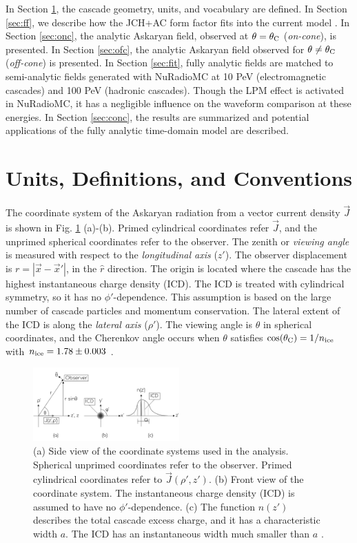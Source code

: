 \documentclass[amsmath,amssymb,aps,prd,10pt,twocolumn]{revtex4}
\begin{document}
In Section \ref{sec:unit}, the cascade geometry, units, and vocabulary are defined.  In Section \ref{sec:ff}, we describe how the JCH+AC form factor fits into the current model \cite{10.1016/j.astropartphys.2017.03.008}.  In Section \ref{sec:onc}, the analytic Askaryan field, observed at $\theta = \theta_{\rm C}$ (\textit{on-cone}), is presented.  In Section \ref{sec:ofc}, the analytic Askaryan field observed for $\theta \neq \theta_{\rm C}$ (\textit{off-cone}) is presented.  In Section \ref{sec:fit}, fully analytic fields are matched to semi-analytic fields generated with NuRadioMC \cite{10.1140/epjc/s10052-020-7612-8} at 10 PeV (electromagnetic cascades) and 100 PeV (hadronic cascades).  Though the LPM effect is activated in NuRadioMC, it has a negligible influence on the waveform comparison at these energies.  In Section \ref{sec:conc}, the results are summarized and potential applications of the fully analytic time-domain model are described.

\section{Units, Definitions, and Conventions}
\label{sec:unit}

The coordinate system of the Askaryan radiation from a vector current density $\vec{J}$ is shown in Fig. \ref{fig:geo} (a)-(b).  Primed cylindrical coordinates refer $\vec{J}$, and the unprimed spherical coordinates refer to the observer.  The zenith or \textit{viewing angle} is measured with respect to the \textit{longitudinal axis} ($z'$).  The observer displacement is $r = |\vec{x} - \vec{x}'|$, in the $\hat{r}$ direction.  The origin is located where the cascade has the highest instantaneous charge density (ICD).  The ICD is treated with cylindrical symmetry, so it has no $\phi'$-dependence.  This assumption is based on the large number of cascade particles and momentum conservation.  The lateral extent of the ICD is along the \textit{lateral axis} ($\rho'$).  The viewing angle is $\theta$ in spherical coordinates, and the Cherenkov angle occurs when $\theta$ satisfies $\cos(\theta_{\rm C}) = 1/n_{\rm ice}$ with $n_{\rm ice} = 1.78 \pm 0.003$ \cite{bog}.

\begin{figure}[ht]
\centering
\includegraphics[width=0.5\textwidth]{Geometry.pdf}
\caption{\label{fig:geo} (a) Side view of the coordinate systems used in the analysis. Spherical unprimed coordinates refer to the observer.  Primed cylindrical coordinates refer to $\vec{J}(\rho',z')$. (b) Front view of the coordinate system.  The instantaneous charge density (ICD) is assumed to have no $\phi'$-dependence. (c) The function $n(z')$ describes the total cascade excess charge, and it has a characteristic width $a$.  The ICD has an instantaneous width much smaller than $a$ \cite{10.1016/j.astropartphys.2017.03.008}.}
\end{figure}
\end{document}

